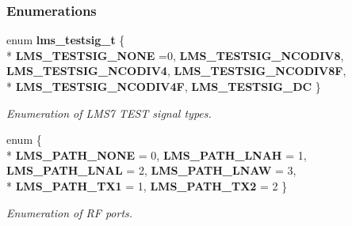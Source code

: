 \subsubsection*{Enumerations}
\begin{DoxyCompactItemize}
\item 
enum {\bf lms\+\_\+testsig\+\_\+t} \{ \\*
{\bf L\+M\+S\+\_\+\+T\+E\+S\+T\+S\+I\+G\+\_\+\+N\+O\+NE} =0, 
{\bf L\+M\+S\+\_\+\+T\+E\+S\+T\+S\+I\+G\+\_\+\+N\+C\+O\+D\+I\+V8}, 
{\bf L\+M\+S\+\_\+\+T\+E\+S\+T\+S\+I\+G\+\_\+\+N\+C\+O\+D\+I\+V4}, 
{\bf L\+M\+S\+\_\+\+T\+E\+S\+T\+S\+I\+G\+\_\+\+N\+C\+O\+D\+I\+V8F}, 
\\*
{\bf L\+M\+S\+\_\+\+T\+E\+S\+T\+S\+I\+G\+\_\+\+N\+C\+O\+D\+I\+V4F}, 
{\bf L\+M\+S\+\_\+\+T\+E\+S\+T\+S\+I\+G\+\_\+\+DC}
 \}\begin{DoxyCompactList}\small\item\em Enumeration of L\+M\+S7 T\+E\+ST signal types. \end{DoxyCompactList}
\item 
enum \{ \\*
{\bf L\+M\+S\+\_\+\+P\+A\+T\+H\+\_\+\+N\+O\+NE} = 0, 
{\bf L\+M\+S\+\_\+\+P\+A\+T\+H\+\_\+\+L\+N\+AH} = 1, 
{\bf L\+M\+S\+\_\+\+P\+A\+T\+H\+\_\+\+L\+N\+AL} = 2, 
{\bf L\+M\+S\+\_\+\+P\+A\+T\+H\+\_\+\+L\+N\+AW} = 3, 
\\*
{\bf L\+M\+S\+\_\+\+P\+A\+T\+H\+\_\+\+T\+X1} = 1, 
{\bf L\+M\+S\+\_\+\+P\+A\+T\+H\+\_\+\+T\+X2} = 2
 \}\begin{DoxyCompactList}\small\item\em Enumeration of RF ports. \end{DoxyCompactList}
\end{DoxyCompactItemize}
